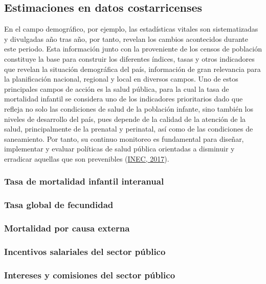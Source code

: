 \documentclass[
]{article}
\begin{document}
\subsection{Estimaciones en datos costarricenses}

En el campo demográfico, por ejemplo, las estadísticas vitales son
sistematizadas y divulgadas año tras año, por tanto, revelan los cambios
acontecidos durante este periodo. Esta información junto con la
proveniente de los censos de población constituye la base para construir
los diferentes índices, tasas y otros indicadores que revelan la
situación demográfica del país, información de gran relevancia para la
planificación nacional, regional y local en diversos campos. Uno de
estos principales campos de acción es la salud pública, para la cual la
tasa de mortalidad infantil se considera uno de los indicadores
prioritarios dado que refleja no solo las condiciones de salud de la
población infante, sino también los niveles de desarrollo del país, pues
depende de la calidad de la atención de la salud, principalmente de la
prenatal y perinatal, así como de las condiciones de saneamiento. Por
tanto, su continuo monitoreo es fundamental para diseñar, implementar y
evaluar políticas de salud pública orientadas a disminuir y erradicar
aquellas que son prevenibles
(\protect\hyperlink{ref-calidad_vitales}{INEC, 2017}).

\subsubsection{Tasa de mortalidad infantil interanual}

\subsubsection{Tasa global de fecundidad}

\subsubsection{Mortalidad por causa externa}

\subsubsection{Incentivos salariales del sector público}

\subsubsection{Intereses y comisiones del sector público}
\end{document}
